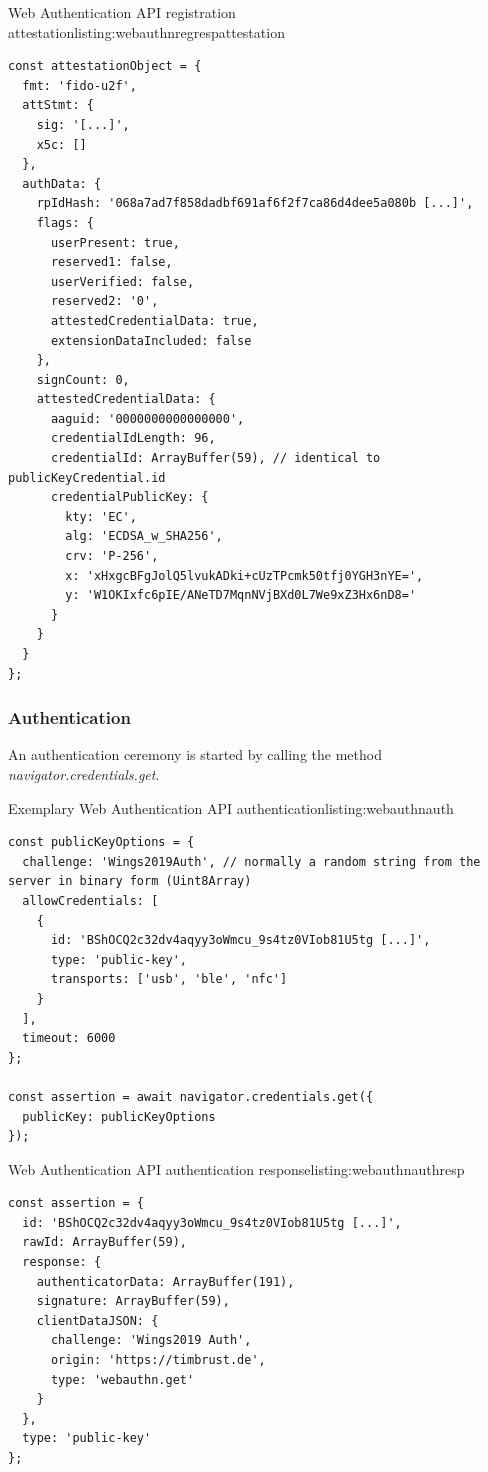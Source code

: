 \begin{example}{Web Authentication API registration attestation}{listing:webauthnregrespattestation}
\begin{verbatim}
const attestationObject = {
  fmt: 'fido-u2f',
  attStmt: {
    sig: '[...]',
    x5c: []
  },
  authData: {
    rpIdHash: '068a7ad7f858dadbf691af6f2f7ca86d4dee5a080b [...]',
    flags: {
      userPresent: true,
      reserved1: false,
      userVerified: false,
      reserved2: '0',
      attestedCredentialData: true,
      extensionDataIncluded: false
    },
    signCount: 0,
    attestedCredentialData: {
      aaguid: '0000000000000000',
      credentialIdLength: 96,
      credentialId: ArrayBuffer(59), // identical to publicKeyCredential.id
      credentialPublicKey: {
        kty: 'EC',
        alg: 'ECDSA_w_SHA256',
        crv: 'P-256',
        x: 'xHxgcBFgJolQ5lvukADki+cUzTPcmk50tfj0YGH3nYE=',
        y: 'W1OKIxfc6pIE/ANeTD7MqnNVjBXd0L7We9xZ3Hx6nD8='
      }
    }
  }
};
\end{verbatim}
\end{example}

\subsubsection{Authentication}

An authentication ceremony is started by calling the method \textit{navigator.credentials.get}.
\\
\begin{example}{Exemplary Web Authentication API authentication}{listing:webauthnauth}
\begin{verbatim}
const publicKeyOptions = {
  challenge: 'Wings2019Auth', // normally a random string from the server in binary form (Uint8Array)
  allowCredentials: [
    {
      id: 'BShOCQ2c32dv4aqyy3oWmcu_9s4tz0VIob81U5tg [...]',
      type: 'public-key',
      transports: ['usb', 'ble', 'nfc']
    }
  ],
  timeout: 6000
};

const assertion = await navigator.credentials.get({
  publicKey: publicKeyOptions
});
\end{verbatim}
\end{example}

\begin{example}{Web Authentication API authentication response}{listing:webauthnauthresp}
\begin{verbatim}
const assertion = {
  id: 'BShOCQ2c32dv4aqyy3oWmcu_9s4tz0VIob81U5tg [...]',
  rawId: ArrayBuffer(59),
  response: {
    authenticatorData: ArrayBuffer(191),
    signature: ArrayBuffer(59),
    clientDataJSON: {
      challenge: 'Wings2019 Auth',
      origin: 'https://timbrust.de',
      type: 'webauthn.get'
    }
  },
  type: 'public-key'
};
\end{verbatim}
\end{example}